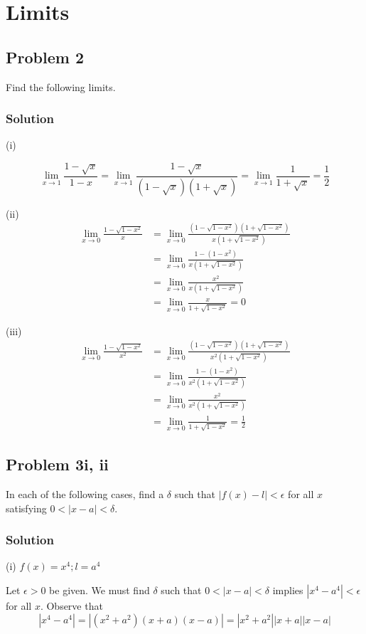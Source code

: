\section{Limits}
\subsection*{Problem 2}
Find the following limits.

\subsubsection*{Solution}
(i)

\[\lim_{x\to 1}\frac{1-\sqrt{x}}{1-x}=\lim_{x\to 1}\frac{1-\sqrt{x}}{(1-\sqrt{x})(1+\sqrt{x})}=\lim_{x\to 1}\frac{1}{1+\sqrt{x}}=\frac{1}{2}\]

(ii)
\begin{align*}
\lim_{x\to 0}\frac{1-\sqrt{1-x^2}}{x}&=\lim_{x\to 0}\frac{(1-\sqrt{1-x^2})(1+\sqrt{1-x^2})}{x(1+\sqrt{1-x^2})}\\
&=\lim_{x\to 0}\frac{1-(1-x^2)}{x(1+\sqrt{1-x^2})}\\
&=\lim_{x\to 0}\frac{x^2}{x(1+\sqrt{1-x^2})}\\
&=\lim_{x\to 0}\frac{x}{1+\sqrt{1-x^2}}=0
\end{align*}

(iii)
\begin{align*}
    \lim_{x\to0}\frac{1-\sqrt{1-x^2}}{x^2}&=\lim_{x\to 0}\frac{(1-\sqrt{1-x^2})(1+\sqrt{1-x^2})}{x^2(1+\sqrt{1-x^2})}\\
    &=\lim_{x\to 0}\frac{1-(1-x^2)}{x^2(1+\sqrt{1-x^2})}\\
    &=\lim_{x\to 0}\frac{x^2}{x^2(1+\sqrt{1-x^2})}\\
    &=\lim_{x\to 0}\frac{1}{1+\sqrt{1-x^2}}=\frac{1}{2}
\end{align*}

\subsection*{Problem 3i, ii}
In each of the following cases, find a $\delta$ such that $|f(x)-l|<\epsilon$ for all $x$ satisfying $0<|x-a|<\delta$.

\subsubsection*{Solution}
(i) $f(x)=x^4; l=a^4$

\vs

Let $\epsilon>0$ be given. We must find $\delta$ such that $0<|x-a|<\delta$ implies $|x^4-a^4|<\epsilon$ for all $x$. Observe that
\[|x^4-a^4|=|(x^2+a^2)(x+a)(x-a)|=|x^2+a^2||x+a||x-a|\]

